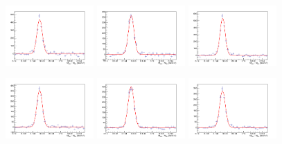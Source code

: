 \begin{figure}[!h]
\begin{center}
\includegraphics[width=0.3\textwidth]{figures/Dstar/pp13TeV/multi_trial/residual_plot_Pow_bkg_func_7-7dot5GeV.png} 
\includegraphics[width=0.3\textwidth]{figures/Dstar/pp13TeV/multi_trial/residual_plot_Pow_bkg_func_7dot5-8GeV.png}
\includegraphics[width=0.3\textwidth]{figures/Dstar/pp13TeV/multi_trial/residual_plot_Pow_bkg_func_8-9GeV.png} 

\includegraphics[width=0.3\textwidth]{figures/Dstar/pp13TeV/multi_trial/residual_plot_Pow_bkg_func_9-10GeV.png} 
\includegraphics[width=0.3\textwidth]{figures/Dstar/pp13TeV/multi_trial/residual_plot_Pow_bkg_func_10-12GeV.png}
\includegraphics[width=0.3\textwidth]{figures/Dstar/pp13TeV/multi_trial/residual_plot_Pow_bkg_func_12-16GeV.png} 


\end{center}
\end{figure}
